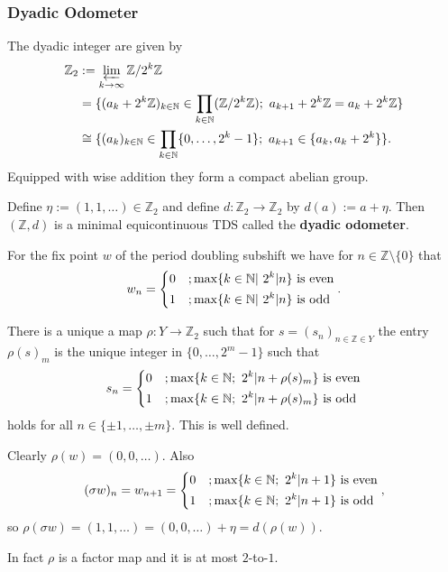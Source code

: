 \begin{frame}
	\frametitle{Dyadic Odometer}
	The dyadic integer are given by
	\begin{align*}
		\mathbb{Z}_2 &:= \varprojlim_{k \to \infty} \mathbb{Z}/2^k\mathbb{Z}\\
		&= \{(a_k + 2^k\mathbb{Z})_{k \in \mathbb{N}} \in \prod_{k \in \mathbb{N}} (\mathbb{Z}/2^k\mathbb{Z});\ a_{k+1} + 2^k\mathbb{Z} = a_k + 2^k\mathbb{Z}\}\\
		&\cong \{(a_k)_{k \in \mathbb{N}} \in \prod_{k \in \mathbb{N}} \{0, \dots, 2^k-1\};\ a_{k+1} \in \{a_k, a_k + 2^k\}\}.
	\end{align*}
	Equipped with wise addition they form a compact abelian group.
	
	Define $\eta := (1, 1, \dots) \in \mathbb{Z}_2$ and define $d: \mathbb{Z}_2 \to \mathbb{Z}_2$ by $d(a) := a + \eta$. Then $(\mathbb{Z}, d)$ is a minimal equicontinuous TDS called the \textbf{dyadic odometer}.
\end{frame}

\begin{frame}
	For the fix point $w$ of the period doubling subshift we have for $n \in \mathbb{Z} \setminus \{0\}$ that
	\begin{align*}
		w_n =
		\begin{dcases}
			0 &; \max\{k \in \mathbb{N}|\ 2^k | n\} \text{ is even}\\
			1 &; \max\{k \in \mathbb{N}|\ 2^k | n\} \text{ is odd}
		\end{dcases}.
	\end{align*}
	\medskip
	
	There is a unique a map $\rho: Y \to \mathbb{Z}_2$ such that for $ s = (s_n)_{n \in \mathbb{Z} \in Y}$ the entry $\rho(s)_m$ is the unique integer in $\{0, \dots, 2^m-1\}$ such that
	\begin{align*}
		s_n =
		\begin{dcases}
			0 &; \max\{k \in \mathbb{N};\ 2^k | n + \rho(s)_m\} \text{ is even}\\
			1 &; \max\{k \in \mathbb{N};\ 2^k | n + \rho(s)_m\} \text{ is odd}
		\end{dcases}
	\end{align*}
	holds for all $n \in \{\pm 1, \dots, \pm m\}$. This is well defined.
	\medskip
	
	Clearly $\rho(w) = (0, 0, \dots)$. Also
	\begin{align*}
		(\sigma w)_n = w_{n+1} =
		\begin{dcases}
			0 &; \max\{k \in \mathbb{N};\ 2^k | n+1\} \text{ is even}\\
			1 &; \max\{k \in \mathbb{N};\ 2^k | n+1\} \text{ is odd}
		\end{dcases},
	\end{align*}
	so $\rho(\sigma w) = (1, 1, \dots ) = (0, 0, \dots) + \eta = d(\rho(w))$.
	
	In fact $\rho$ is a factor map and it is at most $2$-to-$1$.
\end{frame}

